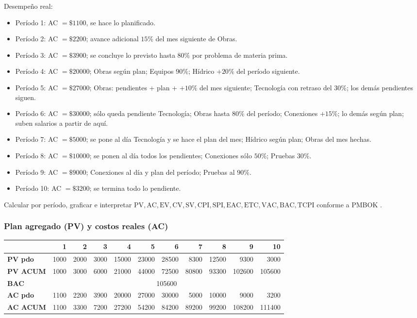 \noindent
Desempeño real:
\begin{itemize}
  \item Período 1: AC \(=\$1100\), se hace lo planificado.
  \item Período 2: AC \(=\$2200\); avance adicional \(15\%\) del mes siguiente de Obras.
  \item Período 3: AC \(=\$3900\); se concluye lo previsto hasta \(80\%\) por problema de materia prima.
  \item Período 4: AC \(=\$20000\); Obras según plan; Equipos \(90\%\); Hídrico \(+20\%\) del período siguiente.
  \item Período 5: AC \(=\$27000\); Obras: pendientes + plan + \(+10\%\) del mes siguiente; Tecnología con retraso del \(30\%\); los demás pendientes siguen.
  \item Período 6: AC \(=\$30000\); sólo queda pendiente Tecnología; Obras hasta \(80\%\) del período; Conexiones \(+15\%\); lo demás según plan; suben salarios a partir de aquí.
  \item Período 7: AC \(=\$5000\); se pone al día Tecnología y se hace el plan del mes; Hídrico según plan; Obras del mes hechas.
  \item Período 8: AC \(=\$10000\); se ponen al día todos los pendientes; Conexiones sólo \(50\%\); Pruebas \(30\%\).
  \item Período 9: AC \(=\$9000\); Conexiones al día y plan del período; Pruebas al \(90\%\).
  \item Período 10: AC \(=\$3200\); se termina todo lo pendiente.
\end{itemize}

\noindent
Calcular por período, graficar e interpretar \(\mathrm{PV, AC, EV, CV, SV, CPI, SPI, EAC, ETC, VAC, BAC, TCPI}\) conforme a PMBOK \cite{PMBOK}.

\subsubsection*{Plan agregado (PV) y costos reales (AC)}
\begin{table}[H]\centering\small
\begin{tabular}{lrrrrrrrrrr}
\toprule
 & \textbf{1} & \textbf{2} & \textbf{3} & \textbf{4} & \textbf{5} & \textbf{6} & \textbf{7} & \textbf{8} & \textbf{9} & \textbf{10} \\
\midrule
\textbf{PV pdo}  & 1000 & 2000 & 3000 & 15000 & 23000 & 28500 & 8300 & 12500 & 9300 & 3000 \\
\textbf{PV ACUM} & 1000 & 3000 & 6000 & 21000 & 44000 & 72500 & 80800 & 93300 & 102600 & 105600 \\
\textbf{BAC}     & \multicolumn{10}{c}{105600} \\
\midrule
\textbf{AC pdo}  & 1100 & 2200 & 3900 & 20000 & 27000 & 30000 & 5000 & 10000 & 9000 & 3200 \\
\textbf{AC ACUM} & 1100 & 3300 & 7200 & 27200 & 54200 & 84200 & 89200 & 99200 & 108200 & 111400 \\
\bottomrule
\end{tabular}
\end{table}


